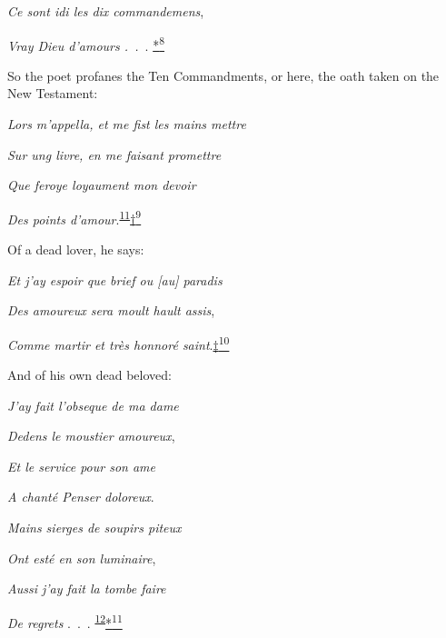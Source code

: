 \emph{Ce sont idi les dix commandemens},

\emph{Vray Dieu d'amours .~.~}.
\protect\hypertarget{11_Chapter_Four__THE_FORMS_OF_LOVE.xhtmlux5cux23id_3115}{\protect\hyperlink{23_NOTES.xhtmlux5cux23id_3116}{*\textsuperscript{8}}}

So the poet profanes the Ten Commandments, or here, the oath taken on
the New Testament:

\emph{Lors m'appella, et me fist les mains mettre}

\emph{Sur ung livre, en me faisant promettre}

\emph{Que feroye loyaument mon devoir}

\emph{Des points
d'amour}.\textsuperscript{\protect\hypertarget{11_Chapter_Four__THE_FORMS_OF_LOVE.xhtmlux5cux23id_1466}{\protect\hyperlink{23_NOTES.xhtmlux5cux23id_1467}{11}}}\protect\hypertarget{11_Chapter_Four__THE_FORMS_OF_LOVE.xhtmlux5cux23id_3117}{\protect\hyperlink{23_NOTES.xhtmlux5cux23id_3118}{†\textsuperscript{9}}}

Of a dead lover, he says:

\emph{Et j'ay espoir que brief ou {[}au{]} paradis}

\emph{Des amoureux sera moult hault assis},

\emph{Comme martir et très honnoré
saint}.\protect\hypertarget{11_Chapter_Four__THE_FORMS_OF_LOVE.xhtmlux5cux23id_3119}{\protect\hyperlink{23_NOTES.xhtmlux5cux23id_3120}{‡\textsuperscript{10}}}

\protect\hypertarget{11_Chapter_Four__THE_FORMS_OF_LOVE.xhtmlux5cux23page_132}{}{}And
of his own dead beloved:

\emph{J'ay fait l'obseque de ma dame}

\emph{Dedens le moustier amoureux},

\emph{Et le service pour son ame}

\emph{A chanté Penser doloreux}.

\emph{Mains sierges de soupirs piteux}

\emph{Ont esté en son luminaire},

\emph{Aussi j'ay fait la tombe faire}

\emph{De regrets} .~.~.
\textsuperscript{\protect\hypertarget{11_Chapter_Four__THE_FORMS_OF_LOVE.xhtmlux5cux23id_1464}{\protect\hyperlink{23_NOTES.xhtmlux5cux23id_1465}{12}}}\protect\hypertarget{11_Chapter_Four__THE_FORMS_OF_LOVE.xhtmlux5cux23id_3121}{\protect\hyperlink{23_NOTES.xhtmlux5cux23id_3122}{*\textsuperscript{11}}}

